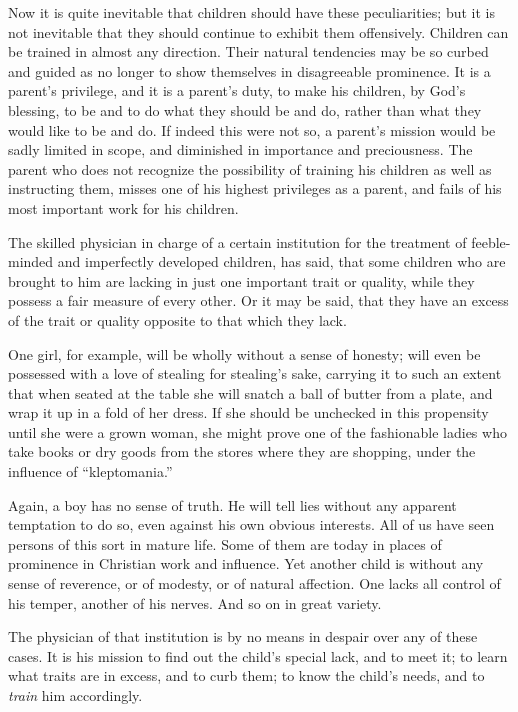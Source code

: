 \documentclass[
]{book}
\begin{document}
Now it is quite inevitable that children should have these peculiarities; but it is not inevitable that they should continue to exhibit them offensively. Children can be trained in almost any direction. Their natural tendencies may be so curbed and guided as no longer to show themselves in disagreeable prominence. It is a parent's privilege, and it is a parent's duty, to make his children, by God's blessing, to be and to do what they should be and do, rather than what they would like to be and do. If indeed this were not so, a parent's mission would be sadly limited in scope, and diminished in importance and preciousness. The parent who does not recognize the possibility of training his children as well as instructing them, misses one of his highest privileges as a parent, and fails of his most important work for his children.

The skilled physician in charge of a certain institution for the treatment of feeble-minded and imperfectly developed children, has said, that some children who are brought to him are lacking in just one important trait or quality, while they possess a fair measure of every other. Or it may be said, that they have an excess of the trait or quality opposite to that which they lack.

One girl, for example, will be wholly without a sense of honesty; will even be possessed with a love of stealing for stealing's sake, carrying it to such an extent that when seated at the table she will snatch a ball of butter from a plate, and wrap it up in a fold of her dress. If she should be unchecked in this propensity until she were a grown woman, she might prove one of the fashionable ladies who take books or dry goods from the stores where they are shopping, under the influence of ``kleptomania.''

Again, a boy has no sense of truth. He will tell lies without any apparent temptation to do so, even against his own obvious interests. All of us have seen persons of this sort in mature life. Some of them are today in places of prominence in Christian work and influence. Yet another child is without any sense of reverence, or of modesty, or of natural affection. One lacks all control of his temper, another of his nerves. And so on in great variety.

The physician of that institution is by no means in despair over any of these cases. It is his mission to find out the child's special lack, and to meet it; to learn what traits are in excess, and to curb them; to know the child's needs, and to \emph{train} him accordingly.
\end{document}
